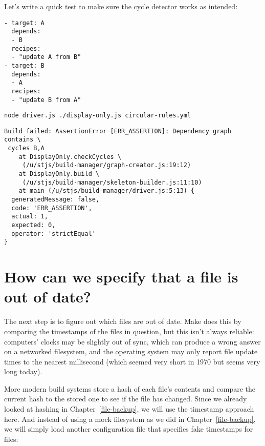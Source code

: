\documentclass[krantzl]{krantz}
\newcommand{\chapref}[1]{Chapter~\ref{#1}}
\begin{document}
Let's write a quick test to make sure the cycle detector works as intended:


\begin{lstlisting}[frame=single,frameround=tttt]
- target: A
  depends:
  - B
  recipes:
  - "update A from B"
- target: B
  depends:
  - A
  recipes:
  - "update B from A"
\end{lstlisting}



\begin{lstlisting}[frame=single,frameround=tttt]
node driver.js ./display-only.js circular-rules.yml
\end{lstlisting}



\begin{lstlisting}[frame=single,frameround=tttt]
Build failed: AssertionError [ERR_ASSERTION]: Dependency graph contains \
 cycles B,A
    at DisplayOnly.checkCycles \
     (/u/stjs/build-manager/graph-creator.js:19:12)
    at DisplayOnly.build \
     (/u/stjs/build-manager/skeleton-builder.js:11:10)
    at main (/u/stjs/build-manager/driver.js:5:13) {
  generatedMessage: false,
  code: 'ERR_ASSERTION',
  actual: 1,
  expected: 0,
  operator: 'strictEqual'
}
\end{lstlisting}


\section{How can we specify that a file is out of date?}\label{build-manager-timestamp}


The next step is to figure out which files are out of date.
Make does this by comparing the timestamps of the files in question,
but this isn't always reliable:
computers' clocks may be slightly out of sync,
which can produce a wrong answer on a networked filesystem,
and the operating system may only report file update times to the nearest millisecond
(which seemed very short in 1970 but seems very long today).


More modern build systems store a hash of each file's contents
and compare the current hash to the stored one to see if the file has changed.
Since we already looked at hashing in \chapref{file-backup},
we will use the timestamp approach here.
And instead of using a mock filesystem as we did in \chapref{file-backup},
we will simply load another configuration file that specifies fake timestamps for files:
\end{document}
